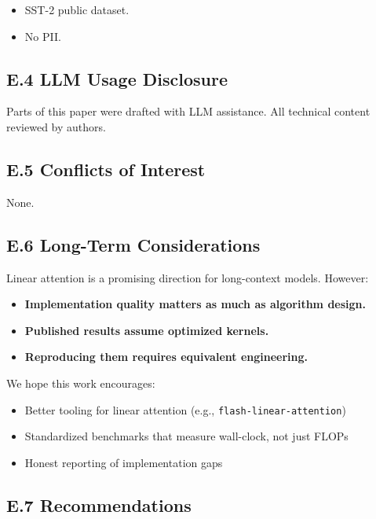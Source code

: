 \begin{itemize}
\item SST-2 public dataset.
\item No PII.

\end{itemize}
\subsection{E.4 LLM Usage Disclosure}

Parts of this paper were drafted with LLM assistance. All technical content 
reviewed by authors.

\subsection{E.5 Conflicts of Interest}

None.

\subsection{E.6 Long-Term Considerations}

Linear attention is a promising direction for long-context models. However:

\begin{itemize}
\item \textbf{Implementation quality matters as much as algorithm design.}
\item \textbf{Published results assume optimized kernels.}
\item \textbf{Reproducing them requires equivalent engineering.}

\end{itemize}
We hope this work encourages:
\begin{itemize}
\item Better tooling for linear attention (e.g., \texttt{flash-linear-attention})
\item Standardized benchmarks that measure wall-clock, not just FLOPs
\item Honest reporting of implementation gaps

\end{itemize}
\subsection{E.7 Recommendations}

